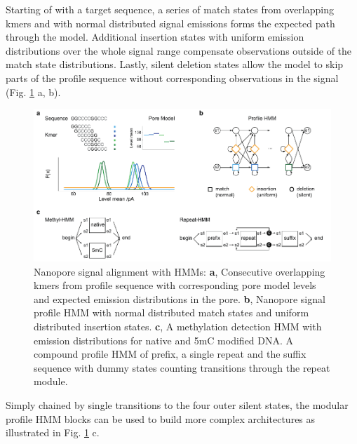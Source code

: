 Starting of with a target sequence, a series of match states from overlapping kmers and with normal distributed signal emissions forms the expected path through the model. Additional insertion states with uniform emission distributions over the whole signal range compensate observations outside of the match state distributions. Lastly, silent deletion states allow the model to skip parts of the profile sequence without corresponding observations in the signal (Fig. \ref{fig:strique:count_hmm} a, b).

\begin{figure}[h]
	\centering
	\includegraphics[width=1.0\textwidth]{figures/signal/count_hmm.pdf}
	\captionsetup{format=plain}
	\caption[Nanopore signal alignment with HMMs]{Nanopore signal alignment with HMMs: \textbf{a}, Consecutive overlapping kmers from profile sequence with corresponding pore model levels and expected emission distributions in the pore. \textbf{b}, Nanopore signal profile HMM with normal distributed match states and uniform distributed insertion states. \textbf{c}, A methylation detection HMM with emission distributions for native and 5mC modified DNA. A compound profile HMM of prefix, a single repeat and the suffix sequence with dummy states counting transitions through the repeat module.}
	\label{fig:strique:count_hmm}
\end{figure}

Simply chained by single transitions to the four outer silent states, the modular profile HMM blocks can be used to build more complex architectures as illustrated in Fig. \ref{fig:strique:count_hmm} c. 

